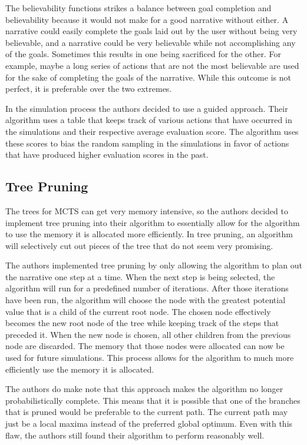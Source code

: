 \documentclass{sig-alternate}
\begin{document}
The believability functions strikes a balance between goal completion and believability because it would not make for a good narrative without either. A narrative could easily complete the goals laid out by the user without being very believable, and a narrative could be very believable while not accomplishing any of the goals. Sometimes this results in one being sacrificed for the other. For example, maybe a long series of actions that are not the most believable are used for the sake of completing the goals of the narrative. While this outcome is not perfect, it is preferable over the two extremes.

In the simulation process the authors decided to use a guided approach. Their algorithm uses a table that keeps track of various actions that have occurred in the simulations and their respective average evaluation score. The algorithm uses these scores to bias the random sampling in the simulations in favor of actions that have produced higher evaluation scores in the past. 
\subsection{Tree Pruning}
The trees for MCTS can get very memory intensive, so the authors decided to implement tree pruning into their algorithm to essentially allow for the algorithm to use the memory it is allocated more efficiently. In tree pruning, an algorithm will selectively cut out pieces of the tree that do not seem very promising.  

The authors implemented tree pruning by only allowing the algorithm to plan out the narrative one step at a time. When the next step is being selected, the algorithm will run for a predefined number of iterations. After those iterations have been run, the algorithm will choose the node with the greatest potential value that is a child of the current root node. The chosen node effectively becomes the new root node of the tree while keeping track of the steps that preceded it. When the new node is chosen, all other children from the previous node are discarded. The memory that those nodes were allocated can now be used for future simulations. This process allows for the algorithm to much more efficiently use the memory it is allocated.

The authors do make note that this approach makes the algorithm no longer probabilistically complete. This means that it is possible that one of the branches that is pruned would be preferable to the current path. The current path may just be a local maxima instead of the preferred global optimum. Even with this flaw, the authors still found their algorithm to perform reasonably well. 
\end{document}
